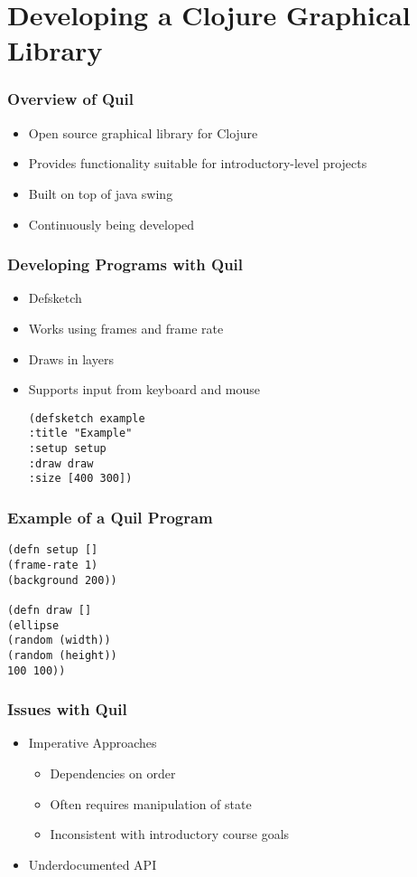 \documentclass{beamer}
\newcommand{\comment}[1]{}
\newcommand{\todo}[1]{\textcolor{blue}{\comment{To Do: {#1}}}}
\begin{document}
\section{Developing a Clojure Graphical Library}

\begin{frame}
\frametitle{Overview of Quil}
\begin{itemize}
\item Open source graphical library for Clojure
\item Provides functionality suitable for introductory-level projects
\item Built on top of java swing
\item Continuously being developed
\end{itemize}
\end{frame}

\begin{frame}[fragile]
\frametitle{Developing Programs with Quil}
\begin{itemize}
\item Defsketch
\item Works using frames and frame rate
\item Draws in layers
\item Supports input from keyboard and mouse
\begin{verbatim}
(defsketch example 
:title "Example"
:setup setup
:draw draw
:size [400 300])
\end{verbatim}
\end{itemize}
\end{frame}

\begin{frame}
\frametitle{Example of a Quil Program}
\begin{itemize}
\begin{verbatim}
(defn setup []
(frame-rate 1)
(background 200))

(defn draw []
(ellipse
(random (width))
(random (height))
100 100))
\end{verbatim}
\end{itemize}
\todo{Add image for this example}
\end{frame}

\begin{frame}
\frametitle{Issues with Quil}
\begin{itemize}
\item Imperative Approaches
	\begin{itemize}
		\item Dependencies on order
		\item Often requires manipulation of state
		\item Inconsistent with introductory course goals
	\end{itemize}
\item Underdocumented API
\end{itemize}
\end{frame}
\end{document}
